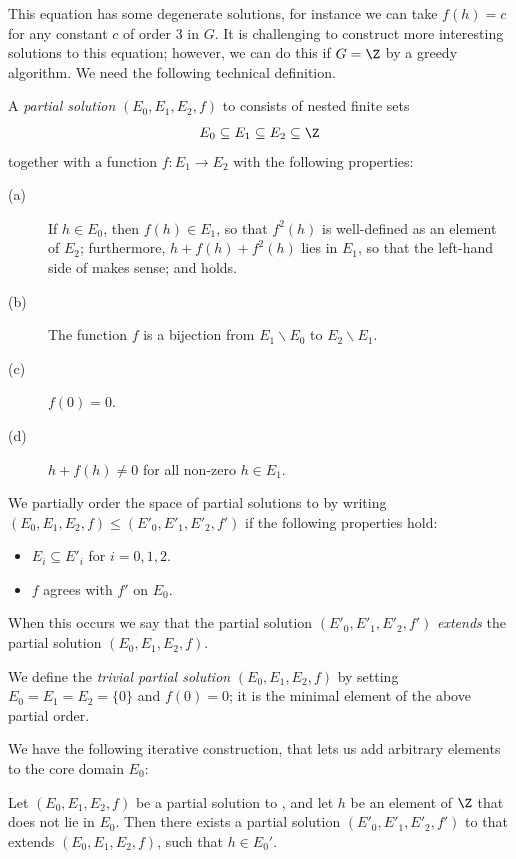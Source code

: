 This equation has some degenerate solutions, for instance we can take $f(h) = c$ for any constant $c$ of order $3$ in $G$.  It is challenging to construct more interesting solutions to this equation; however, we can do this if $G=\Z$ by a greedy algorithm.  We need the following technical definition.

\begin{definition}\label{partial-solution}  A \emph{partial solution} $(E_0, E_1, E_2, f)$ to  consists of nested finite sets
$$ E_0 \subseteq E_1 \subseteq E_2 \subseteq \Z$$ together with a function $f: E_1 \to E_2$ with the following properties:
\begin{description}
  \item[(a)] If $h \in E_0$, then $f(h) \in E_1$, so that $f^2(h)$ is well-defined as an element of $E_2$; furthermore, $h + f(h) + f^2(h)$ lies in $E_1$, so that the left-hand side of  makes sense; and  holds.
  \item[(b)] The function $f$ is a bijection from $E_1 \backslash E_0$ to $E_2 \backslash E_1$.
  \item[(c)] $f(0)=0$.
  \item[(d)] $h+f(h) \neq 0$ for all non-zero $h \in E_1$.
\end{description}

We partially order the space of partial solutions to  by writing $(E_0, E_1, E_2, f) \leq (E'_0, E'_1, E'_2, f')$ if the following properties hold:
\begin{itemize}
  \item $E_i \subseteq E'_i$ for $i=0,1,2$.
  \item $f$ agrees with $f'$ on $E_0$.
\end{itemize}
When this occurs we say that the partial solution $(E'_0, E'_1, E'_2, f')$ \emph{extends} the partial solution $(E_0, E_1, E_2, f)$.

We define the \emph{trivial partial solution} $(E_0,E_1,E_2,f)$ by setting $E_0=E_1=E_2=\{0\}$ and $f(0)=0$; it is the minimal element of the above partial order.
\end{definition}


We have the following iterative construction, that lets us add arbitrary elements to the core domain $E_0$:

\begin{lemma}\label{iteration} Let $(E_0, E_1, E_2, f)$ be a partial solution to , and let $h$ be an element of $\Z$ that does not lie in $E_0$.  Then there exists a partial solution $(E'_0, E'_1, E'_2, f')$ to  that extends $(E_0, E_1, E_2, f)$, such that $h \in E_0'$.
\end{lemma}

